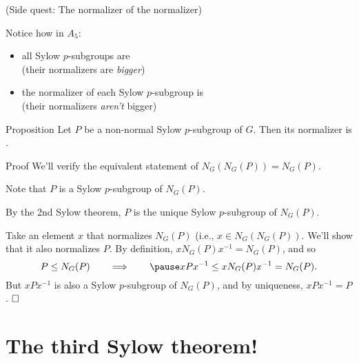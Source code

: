 \documentclass[8pt, handout]{beamer}
\newcommand{\Pause}{\pause}      %
\begin{document}
\begin{frame}{(Side quest: The normalizer of the normalizer)}

  Notice how in $A_5$:
  \begin{itemize}
  \item all Sylow $p$-subgroups are  
  \\(their normalizers are \textit{bigger})\Pause
  \item the normalizer of each Sylow $p$-subgroup is  
    \\(their normalizers \textit{aren't} bigger)
  \end{itemize}

  \vspace{-2mm}\Pause
  
  \begin{block}{Proposition}
    Let $P$ be a non-normal Sylow $p$-subgroup of $G$. Then its
    normalizer is .
  \end{block}
  
  \begin{exampleblock}{Proof} \Pause
    We'll verify the equivalent statement of
    $N_G(N_G(P))=N_G(P)$. \medskip\pause

    Note that $P$ is a  Sylow $p$-subgroup of
    $N_G(P)$. \medskip\Pause

    By the 2nd Sylow theorem, $P$ is the unique Sylow $p$-subgroup of
    $N_G(P)$. \medskip\pause
    
    Take an element $x$ that normalizes $N_G(P)$ (i.e., $x\in
    N_G(N_G(P))$. \Pause We'll show that it also normalizes $P$. \Pause By
    definition, $xN_G(P)x^{-1}=N_G(P)$, and so
    \[
    P\leq N_G(P)\qquad\Longrightarrow\qquad\Pause
    xPx^{-1}\leq xN_G(P)x^{-1}=N_G(P).
    \]
    \pause But $xPx^{-1}$ is also a Sylow $p$-subgroup of $N_G(P)$,
    and by uniqueness, $xPx^{-1}=P$. $\hfill\Box$
  \end{exampleblock}

\end{frame}


\section{The third Sylow theorem!}

\end{document}
